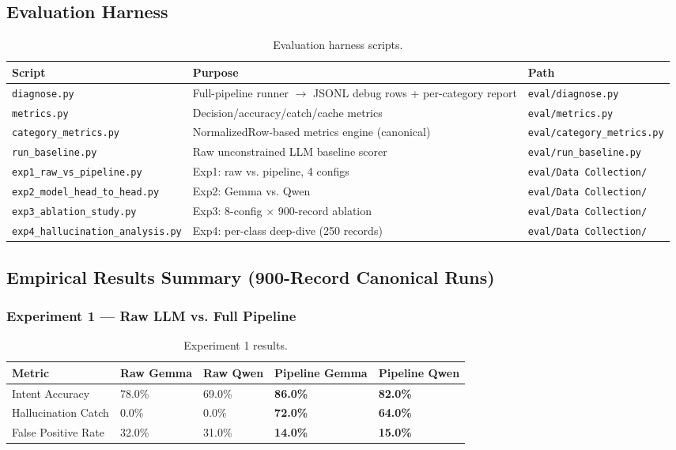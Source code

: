 ﻿\documentclass[10pt,journal,onecolumn]{IEEEtran}
\begin{document}
\subsection{Evaluation Harness}
\begin{table}[t]
\caption{Evaluation harness scripts.}
\label{tab:evalharness}
\begin{tabularx}{\textwidth}{>{\ttfamily}l X X}
\toprule
\textbf{Script} & \textbf{Purpose} & \textbf{Path}\\
\midrule
\texttt{diagnose.py} & Full-pipeline runner $\rightarrow$ JSONL debug rows + per-category report & \texttt{eval/diagnose.py}\\
\texttt{metrics.py} & Decision/accuracy/catch/cache metrics & \texttt{eval/metrics.py}\\
\texttt{category\_metrics.py} & NormalizedRow-based metrics engine (canonical) & \texttt{eval/category\_metrics.py}\\
\texttt{run\_baseline.py} & Raw unconstrained LLM baseline scorer & \texttt{eval/run\_baseline.py}\\
\texttt{exp1\_raw\_vs\_pipeline.py} & Exp1: raw vs. pipeline, 4 configs & \texttt{eval/Data Collection/}\\
\texttt{exp2\_model\_head\_to\_head.py} & Exp2: Gemma vs. Qwen & \texttt{eval/Data Collection/}\\
\texttt{exp3\_ablation\_study.py} & Exp3: 8-config $\times$ 900-record ablation & \texttt{eval/Data Collection/}\\
\texttt{exp4\_hallucination\_analysis.py} & Exp4: per-class deep-dive (250 records) & \texttt{eval/Data Collection/}\\
\bottomrule
\end{tabularx}
\end{table}

\subsection{Empirical Results Summary (900-Record Canonical Runs)}

\subsubsection{Experiment 1 --- Raw LLM vs. Full Pipeline}
\begin{table}[h]
\caption{Experiment 1 results.}
\label{tab:exp1}
\begin{tabularx}{\columnwidth}{l X X X X}
\toprule
\textbf{Metric} & \textbf{Raw Gemma} & \textbf{Raw Qwen} & \textbf{Pipeline Gemma} & \textbf{Pipeline Qwen}\\
\midrule
Intent Accuracy & 78.0\% & 69.0\% & \textbf{86.0\%} & \textbf{82.0\%}\\
Hallucination Catch & 0.0\% & 0.0\% & \textbf{72.0\%} & \textbf{64.0\%}\\
False Positive Rate & 32.0\% & 31.0\% & \textbf{14.0\%} & \textbf{15.0\%}\\
\bottomrule
\end{tabularx}
\end{table}
\end{document}
